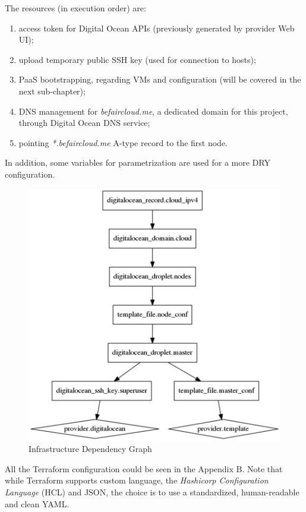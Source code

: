 The resources (in execution order) are:
\begin{enumerate}
\item access token for Digital Ocean APIs (previously generated by provider Web UI);
\item upload temporary public SSH key (used for connection to hosts);
\item PaaS bootstrapping, regarding VMs and configuration (will be covered in the next sub-chapter);
\item DNS management for \textit{befaircloud.me}, a dedicated domain for this project, through Digital Ocean DNS service;
\item pointing \textit{*.befaircloud.me} A-type record to the first node.
\end{enumerate}

In addition, some variables for parametrization are used for a more DRY configuration.

\begin{figure}[htbp]
\centering
\includegraphics{media/ch4-graph.png}
\caption{Infrastructure Dependency Graph}
\end{figure}

All the Terraform configuration could be seen in the Appendix B.  Note that while Terraform supports custom language, the \textit{Hashicorp Configuration Language} (HCL) and JSON, the choice is to use a standardized, human-readable and clean YAML.

